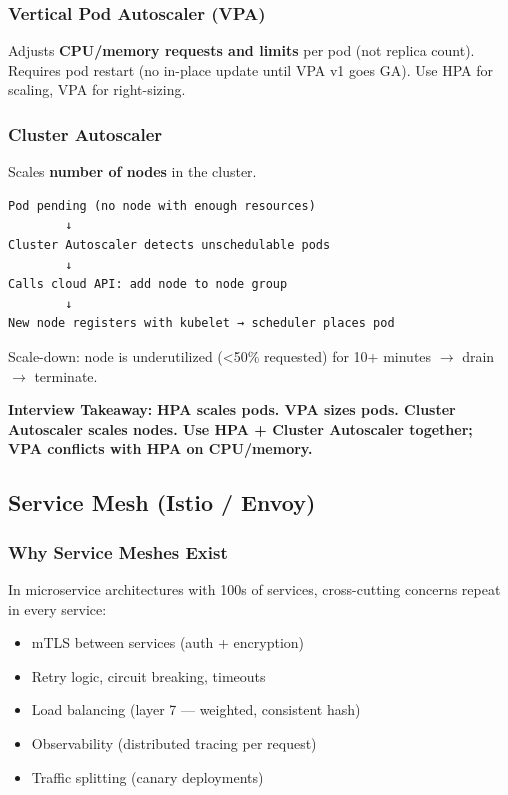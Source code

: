 \documentclass[11pt]{article}
\providecommand{\tightlist}{\setlength{\itemsep}{1pt}\setlength{\parskip}{0pt}}
\begin{document}
\subsubsection{Vertical Pod Autoscaler (VPA)}\label{vertical-pod-autoscaler-vpa}

Adjusts \textbf{CPU/memory requests and limits} per pod (not replica count). Requires pod restart (no in-place update until VPA v1 goes GA). Use HPA for scaling, VPA for right-sizing.

\subsubsection{Cluster Autoscaler}\label{cluster-autoscaler}

Scales \textbf{number of nodes} in the cluster.

\setcodelang{}

\begin{verbatim}
Pod pending (no node with enough resources)
        ↓
Cluster Autoscaler detects unschedulable pods
        ↓
Calls cloud API: add node to node group
        ↓
New node registers with kubelet → scheduler places pod
\end{verbatim}

Scale-down: node is underutilized (\textless50\% requested) for 10+ minutes \(\rightarrow\) drain \(\rightarrow\) terminate.

\textbf{Interview Takeaway:} \textbf{HPA scales pods. VPA sizes pods. Cluster Autoscaler scales nodes. Use HPA + Cluster Autoscaler together; VPA conflicts with HPA on CPU/memory.}

\subsection{Service Mesh (Istio / Envoy)}\label{service-mesh-istio--envoy}

\subsubsection{Why Service Meshes Exist}\label{why-service-meshes-exist}

In microservice architectures with 100s of services, cross-cutting concerns repeat in every service:

\begin{itemize}
\tightlist
\item
  mTLS between services (auth + encryption)
\item
  Retry logic, circuit breaking, timeouts
\item
  Load balancing (layer 7 --- weighted, consistent hash)
\item
  Observability (distributed tracing per request)
\item
  Traffic splitting (canary deployments)
\end{itemize}
\end{document}
